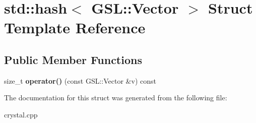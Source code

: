 \hypertarget{structstd_1_1hash_3_01GSL_1_1Vector_01_4}{}\section{std\+:\+:hash$<$ G\+SL\+:\+:Vector $>$ Struct Template Reference}
\label{structstd_1_1hash_3_01GSL_1_1Vector_01_4}
\subsection*{Public Member Functions}
\begin{DoxyCompactItemize}
\item 
\mbox{\label{structstd_1_1hash_3_01GSL_1_1Vector_01_4_ad0db7e8b7d16c146e5a738c1e034b762}} 
size\+\_\+t {\bfseries operator()} (const G\+S\+L\+::\+Vector \&v) const
\end{DoxyCompactItemize}


The documentation for this struct was generated from the following file\+:\begin{DoxyCompactItemize}
\item 
crystal.\+cpp\end{DoxyCompactItemize}
